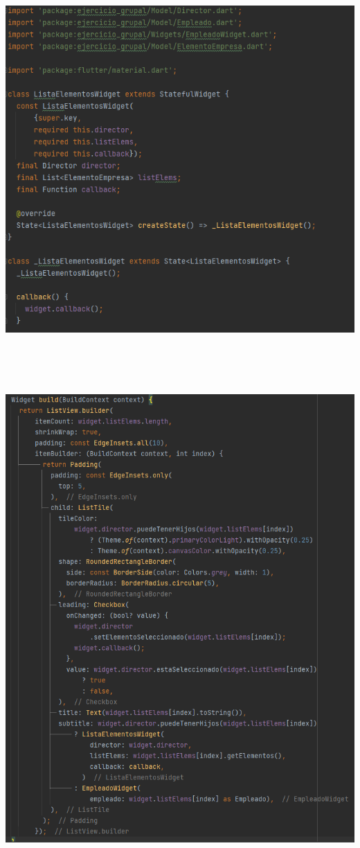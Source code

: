 \documentclass[
]{article}
\begin{document}
\includegraphics[width=5.90522in,height=5.54167in]{imagenes/ListaElementosWidget1.png}

\includegraphics[width=5.90522in,height=7.58333in]{imagenes/ListaElementosWidget2.png}
\end{document}
